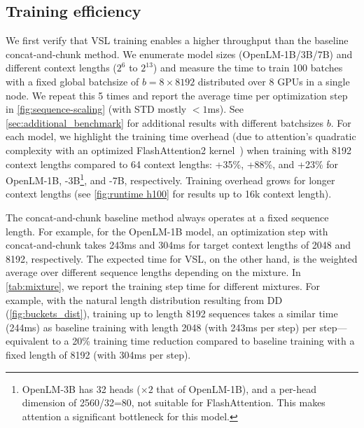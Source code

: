 
\subsection{Training efficiency}\label{sec:benchmark}
We first verify that VSL training enables a higher throughput than the baseline concat-and-chunk method. We enumerate model sizes (OpenLM-1B/3B/7B) and different context lengths ($2^6$ to $2^{13}$) and measure the time to train 100 batches with a fixed global batchsize of $b=8\times 8192$ distributed over $8$ GPUs in a single node. We repeat this 5 times and report the average time per optimization step in \cref{fig:sequence-scaling} (with STD mostly $<1$ms). See \cref{sec:additional_benchmark} for additional results with different batchsizes $b$. For each model, we highlight the training time overhead (due to attention's quadratic complexity with an optimized FlashAttention2 kernel~\citep{dao2023flashattention}) when training with 8192 context lengths compared to 64 context lengths: +35\%, +88\%, and +23\% for OpenLM-1B, -3B\footnote{OpenLM-3B has 32 heads ($\times2$ that of OpenLM-1B), and a per-head dimension of 2560/32=80, not suitable for FlashAttention. This makes attention a significant bottleneck for this model.}, and -7B, respectively. Training overhead grows for longer context lengths (see \cref{fig:runtime h100} for results up to 16k context length).

The concat-and-chunk baseline method always operates at a fixed sequence length. For example, for the OpenLM-1B model, an optimization step with concat-and-chunk takes 243ms and 304ms for target context lengths of 2048 and 8192, respectively. The expected time for VSL, on the other hand, is the weighted average over different sequence lengths depending on the mixture. In \cref{tab:mixture}, we report the training step time for different mixtures. For example, with the natural length distribution resulting from DD (\cref{fig:buckets_dist}), training up to length 8192 sequences takes a similar time (244ms) as baseline training with length 2048 (with 243ms per step) per step—equivalent to a 20\% training time reduction compared to baseline training with a fixed length of 8192 (with 304ms per step).


